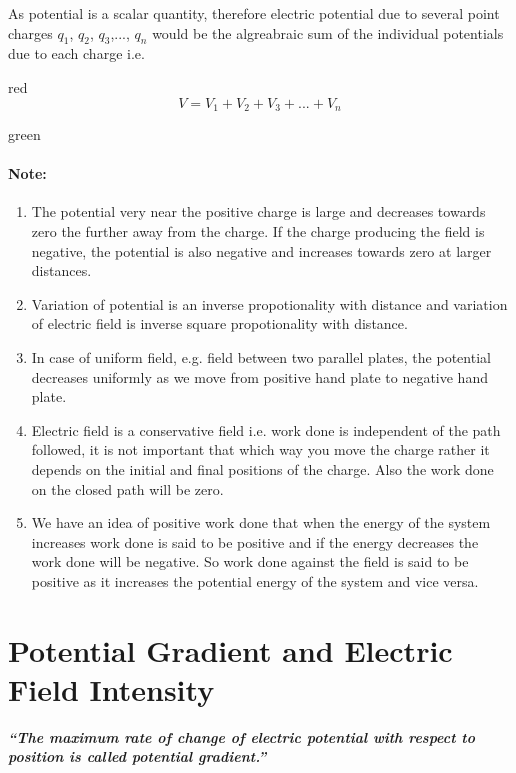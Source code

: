 As potential is a scalar quantity, therefore electric potential due to
several point charges $q_{1}$, $q_{2}$, $q_{3}$,..., $q_{n}$
would be the algreabraic sum of the individual potentials due to each
charge i.e.
\begin{mybox}{red}{}
\begin{equation}
  V = V_{1} +V_{2} + V_{3} + ... + V_{n}
\end{equation}
\end{mybox}
\begin{mybox}{green}{}
\paragraph*{\note{}Note:}
\begin{enumerate}[label = (\roman*)]
\item The potential very near the positive charge is large and decreases
towards zero the further away from the charge. If the charge producing the
field is negative, the potential is also negative and increases towards zero
at larger distances.
\item Variation of potential is an inverse propotionality with distance
and variation of electric field is inverse square propotionality with
distance.
\item In case of uniform field, e.g. field between two parallel plates,
the potential decreases uniformly as we move from positive hand plate
to negative hand plate.
\item Electric field is a conservative field i.e. work done is independent
of the path followed, it is not important that which way you move the
charge rather it depends on the initial and final positions of the charge.
Also the work done on the closed path will be zero.
\item We have an idea of positive work done that when the energy of the
system increases work done is said to be positive and if the energy
decreases the work done will be negative. So work done against the
field is said to be positive as it increases the potential energy
of the system and vice versa.
\end{enumerate}
\end{mybox}
\section{Potential Gradient and Electric Field Intensity}
\textit{\textbf{“The maximum rate of change of electric potential 
with respect to position is called potential gradient.”}}


